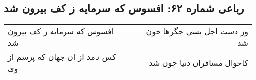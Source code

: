 \begin{center}
\section*{رباعی شماره ۶۲: افسوس که سرمایه ز کف بیرون شد}
\label{sec:sh062}
\begin{longtable}{l p{0.5cm} r}
افسوس که سرمایه ز کف بیرون شد
&&
وز دست اجل بسی جگرها خون شد
\\
کس نامد از آن جهان که پرسم از وی
&&
کاحوال مسافران دنیا چون شد
\\
\end{longtable}
\end{center}
